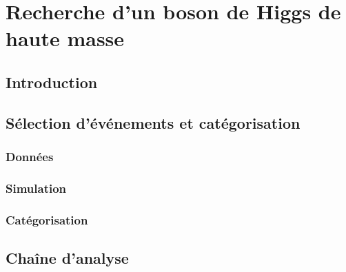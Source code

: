 \chapter{Recherche d'un boson de Higgs de haute masse}\label{chapter-HTT_analysis}

\section{Introduction}\label{chapter-HTT_analysis-section-introduction}

\section{Sélection d'événements et catégorisation}\label{chapter-HTT_analysis-section-evt_selection}
\subsection{Données}\label{chapter-HTT_analysis-section-evt_selection-subsec-data}
\subsection{Simulation}\label{chapter-HTT_analysis-section-evt_selection-subsec-MC}
\subsection{Catégorisation}\label{chapter-HTT_analysis-section-evt_selection-subsec-categorisation}

\section{Chaîne d'analyse}\label{chapter-HTT_analysis-section-chaine_analyse}


